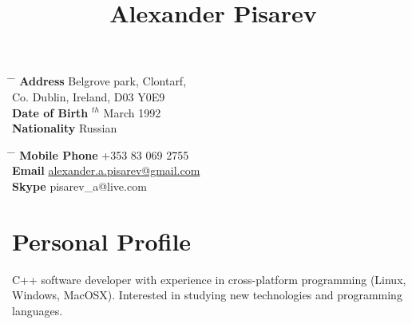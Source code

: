 \documentclass[9pt]{article} %
\begin{document}

\title{Alexander Pisarev} %


\parbox{0.5\textwidth}{ %
\begin{tabbing} %
\hspace{3cm} \= \hspace{4cm} \= \kill %
{\bf Address}  Belgrove park, Clontarf,\\ %
\> Co. Dublin, Ireland, D03 Y0E9 \\ %
{\bf Date of Birth} $^{th}$ March 1992 \\ %
{\bf Nationality} \> Russian %
\end{tabbing}}
\hfill %
\parbox{0.5\textwidth}{ %
\begin{tabbing} %
\hspace{3cm} \= \hspace{4cm} \= \kill %
{\bf Mobile Phone} \> +353 83 069 2755 \\ %
{\bf Email} \> \href{mailto:alexander.a.pisarev@gmail.com}{alexander.a.pisarev@gmail.com} \\ %
{\bf Skype} \> pisarev\_a@live.com \\ %
\end{tabbing}}


\section{Personal Profile}

C++ software developer with experience in cross-platform programming (Linux, Windows, MacOSX). Interested in studying new technologies and programming languages.

\end{document}
